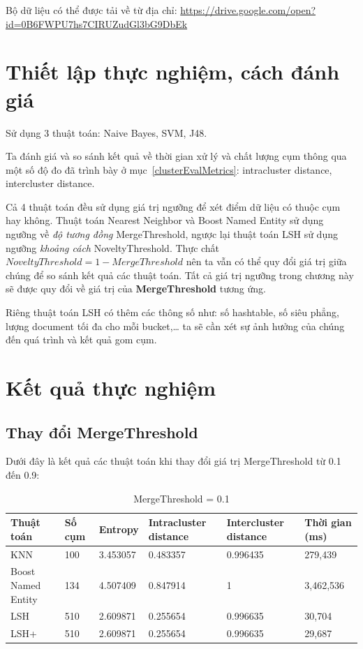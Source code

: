 Bộ dữ liệu có thể được tải về từ địa chỉ: \url{https://drive.google.com/open?id=0B6FWPU7hs7CIRUZudGl3bG9DbEk}

\section{Thiết lập thực nghiệm, cách đánh giá}
Sử dụng 3 thuật toán: Naive Bayes, SVM, J48.

Ta đánh giá và so sánh kết quả về thời gian xử lý và chất lượng cụm thông qua một số độ đo đã trình bày ở mục~\ref{clusterEvalMetrics}: intracluster distance, intercluster distance.

Cả 4 thuật toán đều sử dụng giá trị ngưỡng để xét điểm dữ liệu có thuộc cụm hay không. Thuật toán Nearest Neighbor và Boost Named Entity sử dụng ngưỡng về \textit{độ tương đồng} MergeThreshold, ngược lại thuật toán LSH sử dụng ngưỡng \textit{khoảng cách} NoveltyThreshold. Thực chất $NoveltyThreshold = 1 - MergeThreshold$ nên ta vẫn có thể quy đổi giá trị giữa chúng để so sánh kết quả các thuật toán. Tất cả giá trị ngưỡng trong chương này sẽ được quy đổi về giá trị của \textbf{MergeThreshold} tương ứng.

Riêng thuật toán LSH có thêm các thông số như: số hashtable, số siêu phẳng, lượng document tối đa cho mỗi bucket,… ta sẽ cần xét sự ảnh hưởng của chúng đến quá trình và kết quả gom cụm.
\section{Kết quả thực nghiệm}

	\subsection{Thay đổi MergeThreshold}
	Dưới đây là kết quả các thuật toán khi thay đổi giá trị MergeThreshold từ 0.1 đến 0.9:
		\begin{table}[H]
			\centering
			\setlength\extrarowheight{3pt}
			\begin{tabular}{|l|p{1.4cm}|p{1.5cm}|p{2cm}|p{2cm}|p{1.8cm}|}
				\hline
				Thuật toán  & Số cụm   & Entropy & Intracluster distance & Intercluster distance & Thời gian (ms) \\
				\hline
				KNN   & 100   & 3.453057 & 0.483357 & 0.996435 & 279,439 \\
				\hline
				Boost Named Entity & 134 & 4.507409	& 0.847914 & 1	& 3,462,536 \\
				\hline
				LSH   & 510   & 2.609871 & 0.255654 & 0.996635 & 30,704 \\
				\hline
				LSH+  & 510   & 2.609871 & 0.255654 & 0.996635 & 29,687 \\
				\hline
			\end{tabular}%
		
			\caption{MergeThreshold = 0.1} \label{tab:table_4_1}%
		\end{table}
		
